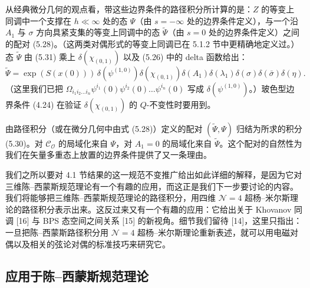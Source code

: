\documentclass[11pt,a4paper,UTF8]{ctexart}
\theoremstyle{plain}
\theoremstyle{definition}
\begin{document}
从经典微分几何的观点看，带这些边界条件的路径积分所计算的是：$Z$ 的等变上同调中一个支撑在 $h\ll\infty$ 处的态 $\Psi$（由 $s=-\infty$ 处的边界条件定义），与一个沿 $A_1$ 与 $\sigma$ 方向具紧支集的等变上同调中的态 $\tilde\Psi$（由 $s=0$ 处的边界条件定义）之间的配对 (5.28)。（这两类对偶形式的等变上同调已在 5.1.2 节中更精确地定义过。）态 $\tilde\Psi$ 由 (5.31) 乘上 $\delta(\chi_{(0,1)})$ 以及 (5.26) 中的 delta 函数给出：
\begin{equation}
    \tilde\Psi=\exp(S(x(0)))\,\delta(\psi^{(1,0)})\delta(\chi_{(0,1)})
    \delta(A_1)\delta(\lambda_1)\delta(\sigma)\delta(\bar\sigma)\delta(\eta).
    \tag{5.33}
\end{equation}
（这里我们已把 $\Omega_{i_1i_2\ldots i_n}\psi^{i_1}(0)\psi^{i_2}(0)\ldots\psi^{i_n}(0)$ 写成 $\delta(\psi^{(1,0)})$。）玻色型边界条件 (4.24) 在验证 $\delta(\chi_{(0,1)})$ 的 $Q$-不变性时要用到。


由路径积分（或在微分几何中由式 (5.28)）定义的配对 $(\tilde\Psi,\Psi)$ 归结为所求的积分 (5.30)。对 $\mathcal C_{\mathcal O}$ 的局域化来自 $\Psi$，对 $A_1=0$ 的局域化来自 $\tilde\Psi$。这个配对的自然性为我们在矢量多重态上放置的边界条件提供了又一条理由。


我们之所以要对 4.1 节结果的这一规范不变推广给出如此详细的解释，是因为它对三维陈–西蒙斯规范理论有一个有趣的应用，而这正是我们下一步要讨论的内容。我们将能够把三维陈–西蒙斯规范理论的路径积分，用四维 $\mathcal N=4$ 超杨–米尔斯理论的路径积分表示出来。这反过来又有一个有趣的应用：它给出关于 Khovanov 同调 [16] 与 BPS 态空间之间关系 [15] 的新视角。细节我们留待 [14]，这里只指出：一旦把陈–西蒙斯路径积分用 $\mathcal N=4$ 超杨–米尔斯理论重新表述，就可以用电磁对偶以及相关的弦论对偶的标准技巧来研究它。




\subsection{应用于陈–西蒙斯规范理论}
\end{document}
